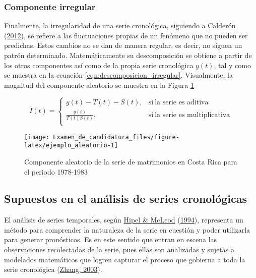 \documentclass[
]{article}
\begin{document}
\subsubsection{Componente irregular}

Finalmente, la irregularidad de una serie cronológica, siguiendo a
\protect\hyperlink{ref-calderon2012estadistica}{Calderón}
(\protect\hyperlink{ref-calderon2012estadistica}{2012}), se refiere a
las fluctuaciones propias de un fenómeno que no pueden ser predichas.
Estos cambios no se dan de manera regular, es decir, no siguen un patrón
determinado. Matemáticamente su descomposición se obtiene a partir de
los otros componentes así como de la propia serie cronológica \(y(t)\),
tal y como se muestra en la ecuación \ref{eqn:descomposicion_irregular}.
Visualmente, la magnitud del componente aleatorio se muestra en la
Figura \ref{fig:ejemplo_aleatorio}

\begin{equation}
\label{eqn:descomposicion_irregular}
I(t)=
\begin{cases}
y(t)-T(t)-S(t), & \text{si}\ \text{la serie es aditiva} \\
\frac{y(t)}{T(t)S(t)} , & \text{si}\ \text{la serie es multiplicativa} \\
\end{cases}
\end{equation}

\begin{figure}[H]
\texttt{[image: Examen\_de\_candidatura\_files/figure-latex/ejemplo\_aleatorio-1]} \caption{Componente aleatorio de la serie de matrimonios en Costa Rica para el periodo 1978-1983}\label{fig:ejemplo_aleatorio}
\end{figure}

\subsection{Supuestos en el análisis de series cronológicas}

El análisis de series temporales, según
\protect\hyperlink{ref-Hipel}{Hipel \& McLeod}
(\protect\hyperlink{ref-Hipel}{1994}), representa un método para
comprender la naturaleza de la serie en cuestión y poder utilizarla para
generar pronósticos. Es en este sentido que entran en escena las
observaciones recolectadas de la serie, pues ellas son analizadas y
sujetas a modelados matemáticos que logren capturar el proceso que
gobierna a toda la serie cronológica
(\protect\hyperlink{ref-Zhang}{Zhang, 2003}).
\end{document}
